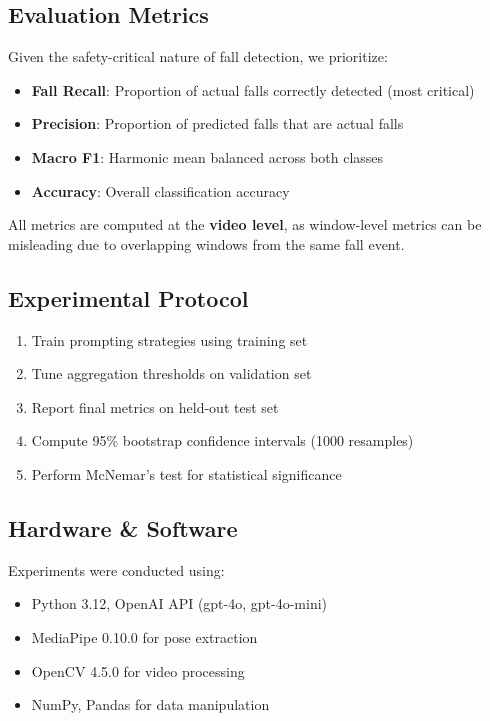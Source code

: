 \documentclass[conference]{IEEEtran}
\begin{document}
\subsection{Evaluation Metrics}

Given the safety-critical nature of fall detection, we prioritize:
\begin{itemize}
    \item \textbf{Fall Recall}: Proportion of actual falls correctly detected (most critical)
    \item \textbf{Precision}: Proportion of predicted falls that are actual falls
    \item \textbf{Macro F1}: Harmonic mean balanced across both classes
    \item \textbf{Accuracy}: Overall classification accuracy
\end{itemize}

All metrics are computed at the \textbf{video level}, as window-level metrics can be misleading due to overlapping windows from the same fall event.

\subsection{Experimental Protocol}

\begin{enumerate}
    \item Train prompting strategies using training set
    \item Tune aggregation thresholds on validation set
    \item Report final metrics on held-out test set
    \item Compute 95\% bootstrap confidence intervals (1000 resamples)
    \item Perform McNemar's test for statistical significance
\end{enumerate}

\subsection{Hardware \& Software}

Experiments were conducted using:
\begin{itemize}
    \item Python 3.12, OpenAI API (gpt-4o, gpt-4o-mini)
    \item MediaPipe 0.10.0 for pose extraction
    \item OpenCV 4.5.0 for video processing
    \item NumPy, Pandas for data manipulation
\end{itemize}
\end{document}
